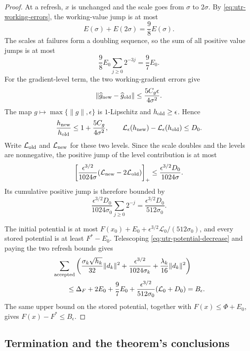 \documentclass{article}
\begin{document}
\begin{proof}
At a refresh, $x$ is unchanged and the scale goes from $\sigma$ to
$2\sigma$.  By \eqref{eq:utr-working-errors}, the working-value jump
is at most
\[
 E(\sigma)+E(2\sigma)=\frac98E(\sigma).
\]
The scales at failures form a doubling sequence, so the sum of all
positive value jumps is at most
\[
 \frac98E_0\sum_{j\ge0}2^{-3j}=\frac97E_0.
\]
For the gradient-level term, the two working-gradient errors give
\[
 \|\widehat g_{\rm new}-\widehat g_{\rm old}\|
 \le\frac{5C_g\epsilon}{4\sigma^2}.
\]
The map $g\mapsto\max\{\|g\|,\epsilon\}$ is $1$-Lipschitz and
$h_{\rm old}\ge\epsilon$.  Hence
\[
 \frac{h_{\rm new}}{h_{\rm old}}
 \le1+\frac{5C_g}{4\sigma^2},
 \qquad
 \mathcal L_\epsilon(h_{\rm new})
       -\mathcal L_\epsilon(h_{\rm old})\le D_0.
\]
Write $\mathcal L_{\rm old}$ and $\mathcal L_{\rm new}$ for these
two levels.  Since the scale doubles and the levels are nonnegative,
the positive jump of the level contribution is at most
\[
 \left[
  \frac{\epsilon^{3/2}}{1024\sigma}
  (\mathcal L_{\rm new}-2\mathcal L_{\rm old})
 \right]_+
 \le\frac{\epsilon^{3/2}D_0}{1024\sigma}.
\]
Its cumulative positive jump is therefore bounded by
\[
 \frac{\epsilon^{3/2}D_0}{1024\sigma_0}\sum_{j\ge0}2^{-j}
 =\frac{\epsilon^{3/2}D_0}{512\sigma_0}.
\]

The initial potential is at most
$F(x_0)+E_0+\epsilon^{3/2}\mathcal L_0/(512\sigma_0)$,
and every stored potential is at
least $F^*-E_0$.  Telescoping \eqref{eq:utr-potential-decrease} and
paying the two refresh bounds gives
\begin{align*}
 &\sum_{\rm accepted}
 \left(\frac{\sigma_k\sqrt{h_k}}{32}\|d_k\|^2
       +\frac{\epsilon^{3/2}}{1024\sigma_k}
       +\frac{\lambda_k}{16}\|d_k\|^2\right)\\
 &\qquad\le\Delta_F+2E_0+\frac97E_0
       +\frac{\epsilon^{3/2}}{512\sigma_0}
       (\mathcal L_0+D_0)=B_\epsilon.
\end{align*}
The same upper bound on the stored potential, together with
$F(x)\le\Phi+E_0$, gives $F(x)-F^*\le B_\epsilon$.

\end{proof}

\subsection{Termination and the theorem's conclusions}
\end{document}

